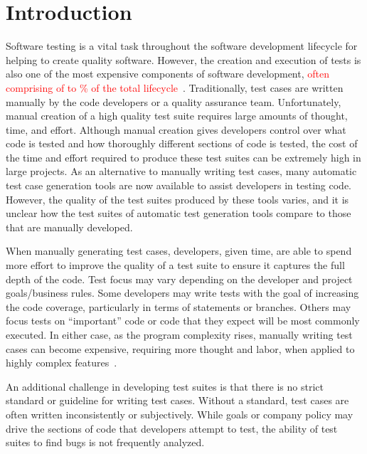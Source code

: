 \section{Introduction}
Software testing is a vital task throughout the software development lifecycle for helping to create quality software.  However, the creation and execution of tests is also one of the most expensive components of software development, \textcolor{red}{often comprising of  to \% of the total lifecycle}~\cite{}.  Traditionally, test cases are written manually by the code developers or a quality assurance team.  Unfortunately, manual creation of a high quality test suite requires large amounts of thought, time, and effort. Although manual creation gives developers control over what code is tested and how thoroughly different sections of code is tested,  the cost of the time and effort required to produce these test suites can be extremely high in large projects.  As an alternative to manually writing test cases, many automatic test case generation tools are now available to assist developers in testing code.  However, the quality of the test suites produced by these tools varies, and it is unclear how the test suites of automatic test generation tools compare to those that are manually developed.

When manually generating test cases, developers, given time, are able to spend more effort to improve the quality of a test suite to ensure it captures the full depth of the code.  Test focus may vary depending on the developer and project goals/business rules.  Some developers may write tests with the goal of increasing the code coverage, particularly in terms of statements or branches.  Others may focus tests on ``important'' code or code that they expect will be most commonly executed.   In either case, as the program complexity rises, manually writing test cases can become expensive, requiring more thought and labor, when applied to highly complex features~\cite{clarke1998automated}.

An additional challenge in developing test suites is that there is no strict standard or guideline for writing test cases.  Without a standard, test cases are often written inconsistently or subjectively.  While goals or company policy may drive the sections of code that developers attempt to test, the ability of test suites to find bugs is not frequently analyzed.

